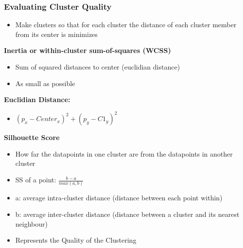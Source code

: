 \subsubsection{Evaluating Cluster Quality}
\begin{itemize}
    \item Make clusters so that for each cluster the distance of each cluster member from its center is minimizes
\end{itemize}
\textbf{Inertia or within-cluster sum-of-squares (WCSS)}
\begin{itemize}
    \item Sum of squared distances to center (euclidian distance)
    \item As small as possible
\end{itemize}
\textbf{Euclidian Distance:}
\begin{itemize}
    \item $(p_x - Center_x)^2 + (p_y - C1_y)^2$
\end{itemize}
\textbf{Silhouette Score}
\begin{itemize}
    \item How far the datapoints in one cluster are from the datapoints in another cluster
    \item SS of a point: $\frac{b-a}{max(a,b)}$
    \item a: average intra-cluster distance (distance between each point within)
    \item b: average inter-cluster distance (distance between a cluster and its nearest neighbour)
    \item Represents the Quality of the Clustering
\end{itemize}